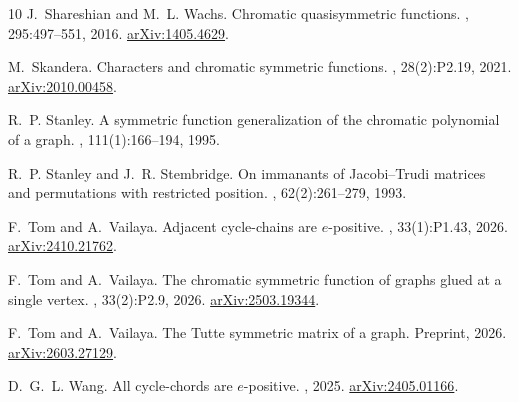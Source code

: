 \documentclass[12pt]{article}
\theoremstyle{plain}
\theoremstyle{definition}
\theoremstyle{remark}
\begin{document}
\begin{thebibliography}{10}
J.~Shareshian and M.~L. Wachs.
\newblock Chromatic quasisymmetric functions.
, 295:497--551, 2016.
\newblock \href{https://arxiv.org/abs/1405.4629}{arXiv:1405.4629}.

M.~Skandera.
\newblock Characters and chromatic symmetric functions.
, 28(2):P2.19, 2021.
\newblock \href{https://arxiv.org/abs/2010.00458}{arXiv:2010.00458}.

R.~P. Stanley.
\newblock A symmetric function generalization of the chromatic polynomial of a graph.
, 111(1):166--194, 1995.

R.~P. Stanley and J.~R. Stembridge.
\newblock On immanants of {J}acobi--{T}rudi matrices and permutations with restricted position.
, 62(2):261--279, 1993.

F.~Tom and A.~Vailaya.
\newblock Adjacent cycle-chains are $e$-positive.
, 33(1):P1.43, 2026.
\newblock \href{https://arxiv.org/abs/2410.21762}{arXiv:2410.21762}.

F.~Tom and A.~Vailaya.
\newblock The chromatic symmetric function of graphs glued at a single vertex.
, 33(2):P2.9, 2026.
\newblock \href{https://arxiv.org/abs/2503.19344}{arXiv:2503.19344}.

F.~Tom and A.~Vailaya.
\newblock The {Tutte} symmetric matrix of a graph.
\newblock Preprint, 2026.
\newblock \href{https://arxiv.org/abs/2603.27129}{arXiv:2603.27129}.

D.~G.~L. Wang.
\newblock All cycle-chords are $e$-positive.
, 2025.
\newblock \href{https://arxiv.org/abs/2405.01166}{arXiv:2405.01166}.

\end{thebibliography}
\end{document}
